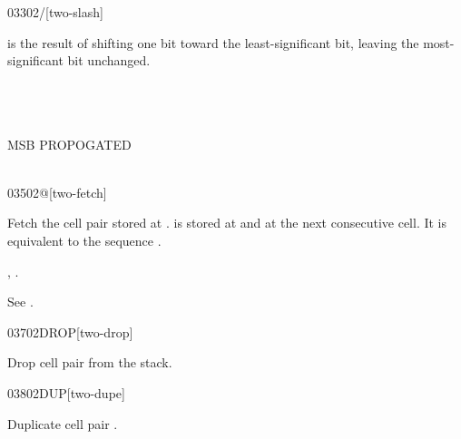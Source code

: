 \begin{worddef}{0330}{2/}[two-slash]
\item {}

	 is the result of shifting  one bit toward
	the least-significant bit, leaving the most-significant bit
	unchanged.

	\begin{testing} %
		 \\
		 \\
		 \\
		  MSB PROPOGATED \\
		 \\
	\end{testing}
\end{worddef}


\begin{worddef}{0350}{2@}[two-fetch]
\item {}

	Fetch the cell pair  stored at .
	 is stored at  and  at the
	next consecutive cell. It is equivalent to the sequence
	    .

\see {},
	.

	\begin{testing} %
		See .
	\end{testing}
\end{worddef}


\begin{worddef}{0370}{2DROP}[two-drop]
\item {}

	Drop cell pair  from the stack.

	\begin{testing} %
	\end{testing}
\end{worddef}


\begin{worddef}{0380}{2DUP}[two-dupe]
\item {}

	Duplicate cell pair .

	\begin{testing} %
	\end{testing}
\end{worddef}


